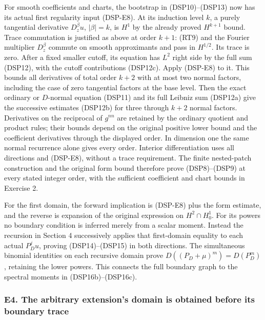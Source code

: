 \documentclass[
  11pt,
]{article}
\makeatletter
\let\ReaderOriginalAnchorStart\hyper@anchorstart
\let\ReaderOriginalAnchorEnd\hyper@anchorend
\let\ReaderPendingAliases\@empty
\def\ReaderArmAliases#1{\gdef\ReaderPendingAliases{#1}}
\def\hyper@anchorstart#1{\ReaderIfNativeAnchorTF{#1}{\ReaderPendingAliases\global\let\ReaderPendingAliases\@empty}{}\ReaderOriginalAnchorStart{#1}}
\makeatother
\begin{document}
For smooth coefficients and charts, the bootstrap in (DSP10)--(DSP13)
now has its actual first regularity input (DSP-E8). At its induction
level \(k\), a purely tangential derivative \(D_z^\beta u\),
\(|\beta|=k\), is \(H^1\) by the already proved \(H^{k+1}\) bound. Trace
commutation is justified as above at order \(k+1\): (RT9) and the
Fourier multiplier \(D_z^\beta\) commute on smooth approximants and pass
in \(H^{1/2}\). Its trace is zero. After a fixed smaller cutoff, its
equation has \(L^2\) right side by the full sum (DSP12), with the cutoff
contributions (DSP12c). Apply (DSP-E8) to it. This bounds all
derivatives of total order \(k+2\) with at most two normal factors,
including the case of zero tangential factors at the base level. Then
the exact ordinary or \(D\)-normal equation (DSP11) and its full Leibniz
sum (DSP12a) give the successive estimates (DSP12b) for three through
\(k+2\) normal factors. Derivatives on the reciprocal of \(g^{nn}\) are
retained by the ordinary quotient and product rules; their bounds depend
on the original positive lower bound and the coefficient derivatives
through the displayed order. In dimension one the same normal recurrence
alone gives every order. Interior differentiation uses all directions
and (DSP-E8), without a trace requirement. The finite nested-patch
construction and the original form bound therefore prove (DSP8)--(DSP9)
at every stated integer order, with the sufficient coefficient and chart
bounds in Exercise 2.

For the first domain, the forward implication is (DSP-E8) plus the form
estimate, and the reverse is expansion of the original expression on
\(H^2\cap H_0^1\). For its powers no boundary condition is inferred
merely from a scalar moment. Instead the recursion in Section 4
successively applies that first-domain equality to each actual
\(P_D^ju\), proving (DSP14)--(DSP15) in both directions. The
simultaneous binomial identities on each recursive domain prove
\(D((P_D+\mu)^m)=D(P_D^m)\), retaining the lower powers. This connects
the full boundary graph to the spectral moments in (DSP16b)--(DSP16c).

\ReaderArmAliases{\ReaderOriginalAnchorStart{e4.-the-arbitrary-extensions-domain-is-obtained-before-its-boundary-trace}\ReaderOriginalAnchorEnd}
\subsubsection{E4. The arbitrary extension's domain is obtained before
its boundary
trace}\label{e4.-the-arbitrary-extensions-domain-is-obtained-before-its-boundary-trace}
\end{document}
